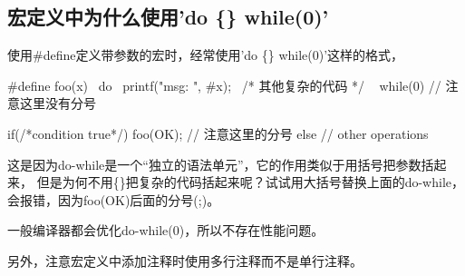 \subsection[Why use 'do \{\} while(0)']{宏定义中为什么使用'do \{\} while(0)'}
使用\#define定义带参数的宏时，经常使用'do \{\} while(0)'这样的格式，

\begin{cppcode}
#define foo(x) \
  do { \
    printf("msg: ", #x); \
    /* 其他复杂的代码 */ \
  } while(0) // 注意这里没有分号

if(/*condition true*/)
  foo(OK); // 注意这里的分号
else
  // other operations
\end{cppcode}

这是因为do-while是一个“独立的语法单元”，它的作用类似于用括号把参数括起来，
但是为何不用\{\}把复杂的代码括起来呢？试试用大括号替换上面的do-while，
会报错，因为foo(OK)后面的分号(;)。

一般编译器都会优化do-while(0)，所以不存在性能问题。

另外，注意宏定义中添加注释时使用多行注释而不是单行注释。